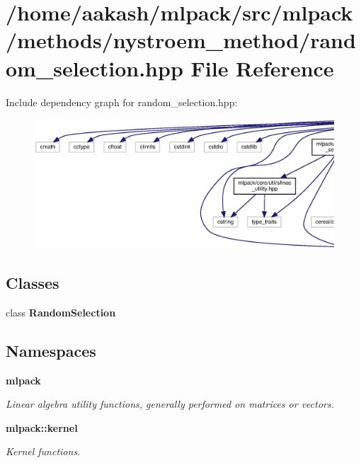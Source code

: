\section{/home/aakash/mlpack/src/mlpack/methods/nystroem\+\_\+method/random\+\_\+selection.hpp File Reference}
\label{random__selection_8hpp}
Include dependency graph for random\+\_\+selection.\+hpp\+:
\nopagebreak
\begin{figure}[H]
\begin{center}
\leavevmode
\includegraphics[width=350pt]{random__selection_8hpp__incl}
\end{center}
\end{figure}
\subsection*{Classes}
\begin{DoxyCompactItemize}
\item 
class \textbf{ Random\+Selection}
\end{DoxyCompactItemize}
\subsection*{Namespaces}
\begin{DoxyCompactItemize}
\item 
 \textbf{ mlpack}
\begin{DoxyCompactList}\small\item\em Linear algebra utility functions, generally performed on matrices or vectors. \end{DoxyCompactList}\item 
 \textbf{ mlpack\+::kernel}
\begin{DoxyCompactList}\small\item\em Kernel functions. \end{DoxyCompactList}\end{DoxyCompactItemize}


